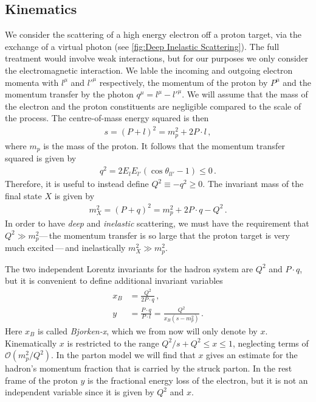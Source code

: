 \subsection*{Kinematics}
We consider the scattering of a high energy electron off a proton target, via the exchange of a virtual photon (see \cref{fig:Deep Inelastic Scattering}). The full treatment would involve weak interactions, but for our purposes we only consider the electromagnetic interaction. We lable the incoming and outgoing electron momenta with $l^{\mu}$ and $l'^{\mu}$ respectively, the momentum of the proton by $P^{\mu}$ and the momentum transfer by the photon $q^{\mu}=l^{\mu}-l'^{\mu}$. We will assume that the mass of the electron and the proton constituents are negligible compared to the scale of the process. The centre-of-mass energy squared is then
\begin{align}
    s=(P+l)^{2}=m_{p}^{2}+2P\cdot l\,,
\end{align}
where $m_{p}$ is the mass of the proton. It follows that the momentum transfer squared is given by
\begin{align}
    q^{2}=2E_{l}E_{l'}(\cos\theta_{ll'}-1)\leq 0\,.
\end{align}
Therefore, it is useful to instead define $Q^{2}\equiv-q^{2}\geq 0$. The invariant mass of the final state $X$ is given by
\begin{align}
    m_{X}^{2}=(P+q)^{2}=m_{p}^{2}+2P\cdot q-Q^{2}\,.
\end{align}
In order to have \emph{deep} and \emph{inelastic} scattering, we must have the requirement that $Q^{2}\gg m_{p}^{2}$---\,the momentum transfer is so large that the proton target is very much excited\,---\,and inelastically $m_{X}^{2}\gg m_{p}^{2}$. 

The two independent Lorentz invariants for the hadron system are $Q^{2}$ and $P\cdot q$, but it is convenient to define additional invariant variables
\begin{align}
    x_{B}&=\frac{Q^{2}}{2P\cdot q}\,,\label{eq:Bjorken-x}
    \\
    y&=\frac{P\cdot q}{P\cdot l}=\frac{Q^{2}}{x_{B}(s-m_{p}^{2})}\,.
\end{align}
Here $x_{B}$ is called \emph{Bjorken-x}, which we from now will only denote by $x$. Kinematically $x$ is restricted to the range $Q^{2}/s+Q^{2}\leq x \leq 1$, neglecting terms of $\mathcal{O}(m_{p}^{2}/Q^{2})$. In the parton model we will find that $x$ gives an estimate for the hadron's momentum fraction that is carried by the struck parton. In the rest frame of the proton $y$ is the fractional energy loss of the electron, but it is not an independent variable since it is given by $Q^{2}$ and $x$.



